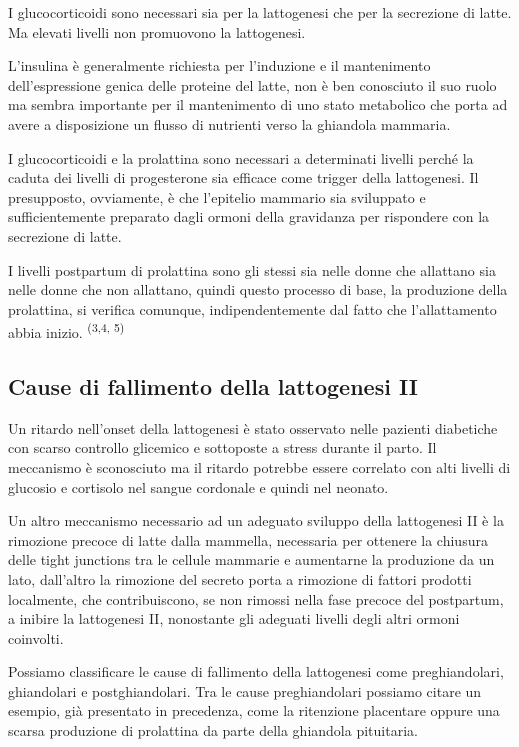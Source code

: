 \documentclass[]{article}
\begin{document}
I glucocorticoidi sono necessari sia per la lattogenesi che per la
secrezione di latte. Ma elevati livelli non promuovono la lattogenesi.

L'insulina è generalmente richiesta per l'induzione e il mantenimento
dell'espressione genica delle proteine del latte, non è ben conosciuto
il suo ruolo ma sembra importante per il mantenimento di uno stato
metabolico che porta ad avere a disposizione un flusso di nutrienti
verso la ghiandola mammaria.

I glucocorticoidi e la prolattina sono necessari a determinati livelli
perché la caduta dei livelli di progesterone sia efficace come trigger
della lattogenesi. Il presupposto, ovviamente, è che l'epitelio mammario
sia sviluppato e sufficientemente preparato dagli ormoni della
gravidanza per rispondere con la secrezione di latte.

I livelli postpartum di prolattina sono gli stessi sia nelle donne che
allattano sia nelle donne che non allattano, quindi questo processo di
base, la produzione della prolattina, si verifica comunque,
indipendentemente dal fatto che l'allattamento abbia inizio.
\textsuperscript{(3,4, 5) }

\hypertarget{cause-di-fallimento-della-lattogenesi-ii}{%
\subsection{Cause di fallimento della lattogenesi
II}\label{cause-di-fallimento-della-lattogenesi-ii}}

Un ritardo nell'onset della lattogenesi è stato osservato nelle pazienti
diabetiche con scarso controllo glicemico e sottoposte a stress durante
il parto. Il meccanismo è sconosciuto ma il ritardo potrebbe essere
correlato con alti livelli di glucosio e cortisolo nel sangue cordonale
e quindi nel neonato.

Un altro meccanismo necessario ad un adeguato sviluppo della lattogenesi
II è la rimozione precoce di latte dalla mammella, necessaria per
ottenere la chiusura delle tight junctions tra le cellule mammarie e
aumentarne la produzione da un lato, dall'altro la rimozione del secreto
porta a rimozione di fattori prodotti localmente, che contribuiscono, se
non rimossi nella fase precoce del postpartum, a inibire la lattogenesi
II, nonostante gli adeguati livelli degli altri ormoni coinvolti.

Possiamo classificare le cause di fallimento della lattogenesi come
preghiandolari, ghiandolari e postghiandolari. Tra le cause
preghiandolari possiamo citare un esempio, già presentato in precedenza,
come la ritenzione placentare oppure una scarsa produzione di prolattina
da parte della ghiandola pituitaria.
\end{document}
